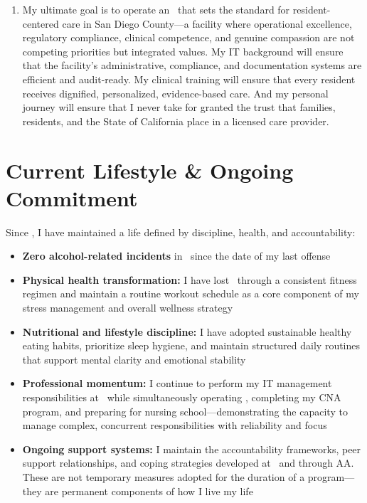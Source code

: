 \begin{enumerate}[leftmargin=2em, itemsep=0.4em]
  \item {} My ultimate goal is to operate an \FacilityTypeShort\ that sets the standard for resident-centered care in San Diego County---a facility where operational excellence, regulatory compliance, clinical competence, and genuine compassion are not competing priorities but integrated values. My IT background will ensure that the facility's administrative, compliance, and documentation systems are efficient and audit-ready. My clinical training will ensure that every resident receives dignified, personalized, evidence-based care. And my personal journey will ensure that I never take for granted the trust that families, residents, and the State of California place in a licensed care provider.
\end{enumerate}

\section{Current Lifestyle \& Ongoing Commitment}

Since \IncidentTwoDate, I have maintained a life defined by discipline, health, and accountability:

\begin{itemize}[leftmargin=2em, itemsep=0.3em]
  \item \textbf{Zero alcohol-related incidents} in \TimeSinceLastIncident\ since the date of my last offense
  \item \textbf{Physical health transformation:} I have lost \WeightLoss\ through a consistent fitness regimen and maintain a routine workout schedule as a core component of my stress management and overall wellness strategy
  \item \textbf{Nutritional and lifestyle discipline:} I have adopted sustainable healthy eating habits, prioritize sleep hygiene, and maintain structured daily routines that support mental clarity and emotional stability
  \item \textbf{Professional momentum:} I continue to perform my IT management responsibilities at \EmployerName\ while simultaneously operating \LLCName, completing my CNA program, and preparing for nursing school---demonstrating the capacity to manage complex, concurrent responsibilities with reliability and focus
  \item \textbf{Ongoing support systems:} I maintain the accountability frameworks, peer support relationships, and coping strategies developed at \RehabProgram\ and through AA. These are not temporary measures adopted for the duration of a program---they are permanent components of how I live my life
\end{itemize}

